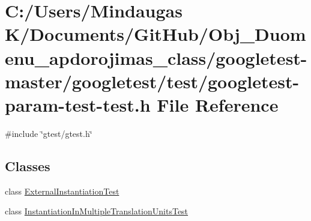 \hypertarget{googletest-master_2googletest_2test_2googletest-param-test-test_8h}{}\section{C\+:/\+Users/\+Mindaugas K/\+Documents/\+Git\+Hub/\+Obj\+\_\+\+Duomenu\+\_\+apdorojimas\+\_\+class/googletest-\/master/googletest/test/googletest-\/param-\/test-\/test.h File Reference}
\label{googletest-master_2googletest_2test_2googletest-param-test-test_8h}
{\ttfamily \#include \char`\"{}gtest/gtest.\+h\char`\"{}}\newline
\subsection*{Classes}
\begin{DoxyCompactItemize}
\item 
class \mbox{\hyperlink{class_external_instantiation_test}{External\+Instantiation\+Test}}
\item 
class \mbox{\hyperlink{class_instantiation_in_multiple_translation_units_test}{Instantiation\+In\+Multiple\+Translation\+Units\+Test}}
\end{DoxyCompactItemize}
